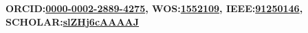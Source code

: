 \documentclass[mm,10pt,a4paper]{simple_style}
\newcommand{\MyLinks}{\noindent
\textbf{ORCID:\href{http://orcid.org/0000-0002-2889-4275}{0000-0002-2889-4275}, \hfill
WOS:\href{https://www.webofscience.com/wos/author/record/1552109}{1552109}, \hfill
IEEE:\href{https://ieeexplore.ieee.org/author/37086581106}{91250146}, \hfill
SCHOLAR:\href{https://scholar.google.co.in/citations?user=slZHj6cAAAAJ}{slZHj6cAAAAJ}\ }}
\begin{document}
\begin{resume}
\fullline
\small{\hspace*{-10.2em}\MyLinks} \\
\vspace{-1em}
\sectionline
%
%
%
%
%
%
%
%
%

%
%
\end{resume}
\nocite{*}
\end{document}

